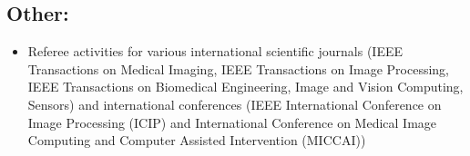 \subsection*{Other:}
\vspace{1ex}
\begin{itemize}
\item Referee activities for various international scientific journals
 (IEEE Transactions on Medical Imaging, IEEE
  Transactions on Image Processing, IEEE Transactions on Biomedical
  Engineering, Image and Vision Computing, Sensors) and international
  conferences (IEEE International Conference on Image
    Processing (ICIP) and International Conference on Medical Image Computing and Computer
    Assisted Intervention (MICCAI))
	
 
\end{itemize}





